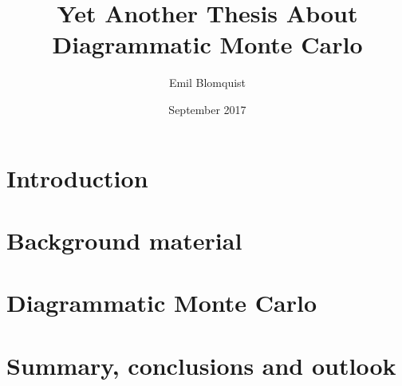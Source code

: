 \documentclass[nocoverpage,swedish,g5paper]{thesis}
\title{Yet Another Thesis About Diagrammatic Monte Carlo}
\author{Emil Blomquist}
\date{September 2017}
\begin{document}
\begin{abstract}

\end{abstract}

\begin{otherlanguage}{swedish}
\begin{foreginabstract}

\end{foreginabstract}
\end{otherlanguage}

\begin{preface}

\end{preface}

\tableofcontents

\mainmatter




\chapter{Introduction}


\chapter{Background material}


\chapter{Diagrammatic Monte Carlo}


\chapter{Summary, conclusions and outlook}


%

\cleardoublepage
{}




%
\end{document}
